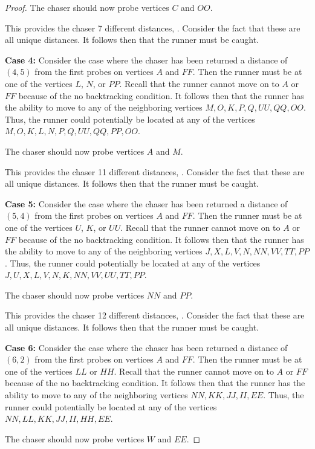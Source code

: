 \documentclass[11pt]{article}
\begin{document}
\begin{proof}
		The chaser should now probe vertices $C$ and $OO$.
		
		This provides the chaser 7 different distances, . Consider the fact that these are all unique distances. It follows then that the runner must be caught.
		
		\textbf{Case 4:} Consider the case where the chaser has been returned a distance of $(4,5)$ from the first probes on vertices $A$ and $FF$. Then the runner must be at one of the vertices $L$, $N$, or $PP$. Recall that the runner cannot move on to $A$ or $FF$ because of the no backtracking condition. It follows then that the runner has the ability to move to any of the neighboring vertices $M,O,K,P,Q,UU,QQ,OO$. Thus, the runner could potentially be located at any of the vertices $M,O,K,L,N,P,Q,UU,QQ,PP,OO$.
		
		The chaser should now probe vertices $A$ and $M$.
		
		This provides the chaser 11 different distances, . Consider the fact that these are all unique distances. It follows then that the runner must be caught.
		
		\textbf{Case 5:} Consider the case where the chaser has been returned a distance of $(5,4)$ from the first probes on vertices $A$ and $FF$. Then the runner must be at one of the vertices $U$, $K$, or $UU$. Recall that the runner cannot move on to $A$ or $FF$ because of the no backtracking condition. It follows then that the runner has the ability to move to any of the neighboring vertices $J,X,L,V,N,NN,VV,TT,PP$. Thus, the runner could potentially be located at any of the vertices $J,U,X,L,V,N,K,NN,VV,UU,TT,PP$.
		
		The chaser should now probe vertices $NN$ and $PP$.
		
		This provides the chaser 12 different distances, . Consider the fact that these are all unique distances. It follows then that the runner must be caught.
		
		\textbf{Case 6:} Consider the case where the chaser has been returned a distance of $(6,2)$ from the first probes on vertices $A$ and $FF$. Then the runner must be at one of the vertices $LL$ or $HH$. Recall that the runner cannot move on to $A$ or $FF$ because of the no backtracking condition. It follows then that the runner has the ability to move to any of the neighboring vertices $NN,KK,JJ,II,EE$. Thus, the runner could potentially be located at any of the vertices $NN,LL,KK,JJ,II,HH,EE$.
		
		The chaser should now probe vertices $W$ and $EE$.
		

\end{proof}
\end{document}
